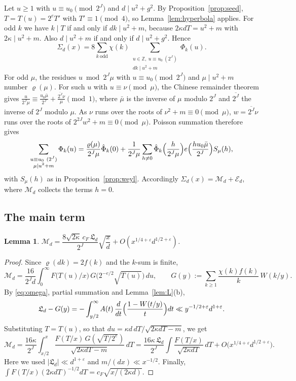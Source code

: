 \documentclass[11pt]{amsart}
\newtheorem{lemma}[theorem]{Lemma}
\theoremstyle{remark}
\theoremstyle{definition}
\numberwithin{equation}{section}
\newcommand{\Z}{\mathbb{Z}}
\newcommand{\eps}{\varepsilon}
\newcommand{\Lf}{\mathfrak{L}}
\begin{document}
Let $u\ge1$ with $u\equiv u_0\pmod{2^J}$ and $d\mid u^2+g^2$. By Proposition~\ref{prop:seed}, $T=T(u)=2^eT'$ with $T'\equiv1\pmod 4$, so Lemma~\ref{lem:hyperbola} applies. For odd $k$ we have $k\mid T$ if and only if $dk\mid u^2+m$, because $2\kappa dT=u^2+m$ with $2\kappa\mid u^2+m$. Also $d\mid u^2+m$ if and only if $d\mid u^2+g^2$. Hence
\begin{equation}\label{eq:Sigma2}
\Sigma_d(x)=8\sum_{k\ \mathrm{odd}}\chi(k)\sum_{\substack{u\in\Z,\ u\equiv u_0\ (2^J)\\ dk\mid u^2+m}}\Phi_k(u).
\end{equation}
For odd $\mu$, the residues $u\bmod2^J\mu$ with $u\equiv u_0\pmod{2^J}$ and $\mu\mid u^2+m$ number $\varrho(\mu)$. For such $u$ with $u\equiv\nu\pmod\mu$, the Chinese remainder theorem gives $\frac{u}{2^J\mu}\equiv\frac{u_0\bar\mu}{2^J}+\frac{\overline{2^J}\nu}{\mu}\pmod1$, where $\bar\mu$ is the inverse of $\mu$ modulo $2^J$ and $\overline{2^J}$ the inverse of $2^J$ modulo $\mu$. As $\nu$ runs over the roots of $\nu^2+m\equiv0\pmod\mu$, $w=\overline{2^J}\nu$ runs over the roots of $2^{2J}w^2+m\equiv0\pmod\mu$. Poisson summation therefore gives
\[
\sum_{\substack{u\equiv u_0\ (2^J)\\ \mu\mid u^2+m}}\Phi_k(u)=\frac{\varrho(\mu)}{2^J\mu}\hat\Phi_k(0)+\frac1{2^J\mu}\sum_{h\ne0}\hat\Phi_k\Bigl(\frac h{2^J\mu}\Bigr)e\Bigl(\frac{hu_0\bar\mu}{2^J}\Bigr)S_\mu(h),
\]
with $S_\mu(h)$ as in Proposition~\ref{prop:weyl}. Accordingly $\Sigma_d(x)=\mathcal M_d+\mathcal E_d$, where $\mathcal M_d$ collects the terms $h=0$.

\subsection{The main term}

\begin{lemma}\label{lem:main}
$\mathcal M_d=\dfrac{8\sqrt{2\kappa}\,c_F\,\Lf_d}{2^J}\sqrt{\dfrac xd}+O(x^{1/4+\eps}d^{1/2+\eps})$.
\end{lemma}

\begin{proof}
Since $\varrho(dk)=2f(k)$ and the $k$-sum is finite,
\[
\mathcal M_d=\frac{16}{2^Jd}\int_0^\infty F\bigl(T(u)/x\bigr)\,G\bigl(2^{-e/2}\sqrt{T(u)}\bigr)\,du,\qquad G(y):=\sum_{k\ge1}\frac{\chi(k)f(k)}k\,W(k/y).
\]
By \eqref{eq:omega}, partial summation and Lemma~\ref{lem:L}(b),
\[
\Lf_d-G(y)=-\int_{y/2}^\infty A(t)\,\frac{d}{dt}\Bigl(\frac{1-W(t/y)}t\Bigr)dt\ll y^{-1/2+\eps}d^{1+\eps}.
\]
Substituting $T=T(u)$, so that $du=\kappa d\,dT/\sqrt{2\kappa dT-m}$, we get
\[
\mathcal M_d=\frac{16\kappa}{2^J}\int_{x/2}^x\frac{F(T/x)\,G(\sqrt{T/2^e})}{\sqrt{2\kappa dT-m}}\,dT=\frac{16\kappa\,\Lf_d}{2^J}\int\frac{F(T/x)}{\sqrt{2\kappa dT}}\,dT+O\bigl(x^{1/4+\eps}d^{1/2+\eps}\bigr).
\]
Here we used $|\Lf_d|\ll d^{1+\eps}$ and $m/(dx)\ll x^{-1/2}$. Finally, $\int F(T/x)(2\kappa dT)^{-1/2}dT=c_F\sqrt{x/(2\kappa d)}$.
\end{proof}
\end{document}
